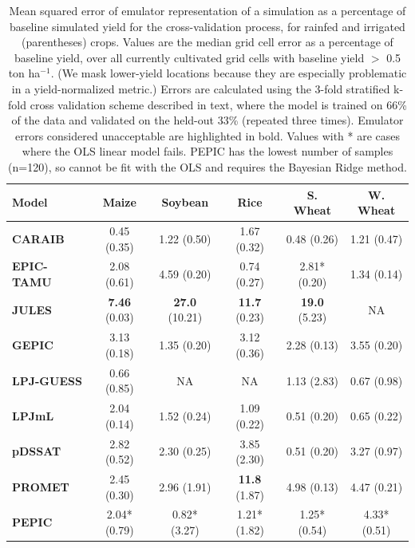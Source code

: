 \documentclass[gmd, manuscript]{copernicus} %
\begin{document}
\begin{table}[hb]
    \caption{
	    Mean squared error of emulator representation of a simulation as a percentage of baseline simulated yield for the cross-validation process, for rainfed and irrigated (parentheses) crops. Values are the median grid cell error as a percentage of baseline yield, over all currently cultivated grid cells with baseline yield $>$ 0.5 ton ha$^{-1}$. (We mask lower-yield locations because they are especially problematic in a yield-normalized metric.) %
    Errors are calculated using the 3-fold stratified k-fold cross validation scheme described in text, where the model is trained on 66\% of the data and validated on the held-out 33\% (repeated three times). 
    Emulator errors considered unacceptable are highlighted in bold. 
        Values with * are cases where the OLS linear model fails. PEPIC has the lowest number of samples (n=120), so cannot be fit with the OLS and requires the Bayesian Ridge method.
    } 
    \label{table:ASE}
    \begin{tabular}{l | c | c | c | c | c} 
        \hline
        \textbf{Model}     & \textbf{Maize} & \textbf{Soybean} & \textbf{Rice} & \textbf{S. Wheat} & \textbf{W. Wheat} \\ \hline
        \textbf{CARAIB}    & 0.45 (0.35) & 1.22 (0.50) & 1.67 (0.32) & 0.48 (0.26) & 1.21 (0.47) \\ \hline
        \textbf{EPIC-TAMU} & 2.08 (0.61) & 4.59 (0.20) & 0.74 (0.27) & 2.81* (0.20) & 1.34 (0.14)  \\ \hline
        \textbf{JULES}     & \textbf{7.46} (0.03) & \textbf{27.0} (10.21)& \textbf{11.7} (0.23) & \textbf{19.0} (5.23)  & NA  \\ \hline
        \textbf{GEPIC}     & 3.13 (0.18) & 1.35 (0.20) & 3.12 (0.36) & 2.28 (0.13) & 3.55 (0.20) \\ \hline
        \textbf{LPJ-GUESS} & 0.66 (0.85) & NA    & NA  & 1.13 (2.83) & 0.67 (0.98)  \\ \hline
        \textbf{LPJmL}     & 2.04 (0.14) & 1.52 (0.24) & 1.09 (0.22) & 0.51 (0.20) & 0.65 (0.22)  \\ \hline
        \textbf{pDSSAT}    & 2.82 (0.52) & 2.30 (0.25) & 3.85 (2.30) & 0.51 (0.20) & 3.27 (0.97)  \\ \hline
        \textbf{PROMET}    & 2.45 (0.30) & 2.96 (1.91) & \textbf{11.8} (1.87) & 4.98 (0.13) & 4.47 (0.21)  \\ \hline
        \textbf{PEPIC}     & 2.04* (0.79) & 0.82* (3.27) & 1.21* (1.82) & 1.25* (0.54) & 4.33* (0.51) \\ \hline
    \end{tabular}
\end{table}
\end{document}
